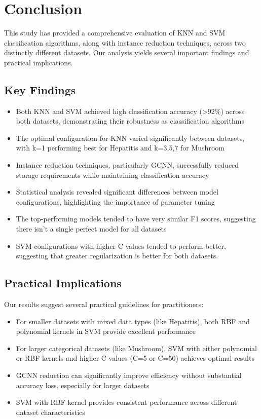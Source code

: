 \section{Conclusion}
\label{sec:conclusion}

This study has provided a comprehensive evaluation of KNN and SVM classification algorithms, along with instance reduction techniques, across two distinctly different datasets. Our analysis yields several important findings and practical implications.

\subsection{Key Findings}

\begin{itemize}
    \item Both KNN and SVM achieved high classification accuracy (\textgreater 92\%) across both datasets, demonstrating their robustness as classification algorithms
    \item The optimal configuration for KNN varied significantly between datasets, with k=1 performing best for Hepatitis and k=3,5,7 for Mushroom
    \item Instance reduction techniques, particularly GCNN, successfully reduced storage requirements while maintaining classification accuracy
    \item Statistical analysis revealed significant differences between model configurations, highlighting the importance of parameter tuning
    \item The top-performing models tended to have very similar F1 scores, suggesting there isn't a single perfect model for all datasets
    \item SVM configurations with higher C values tended to perform better, suggesting that greater regularization is better for both datasets.
\end{itemize}

\subsection{Practical Implications}

Our results suggest several practical guidelines for practitioners:
\begin{itemize}
    \item For smaller datasets with mixed data types (like Hepatitis), both RBF and polynomial kernels in SVM provide excellent performance
    \item For larger categorical datasets (like Mushroom), SVM with either polynomial or RBF kernels and higher C values (C=5 or C=50) achieves optimal results
    \item GCNN reduction can significantly improve efficiency without substantial accuracy loss, especially for larger datasets
    \item SVM with RBF kernel provides consistent performance across different dataset characteristics
\end{itemize}

